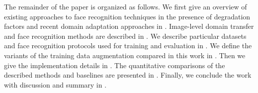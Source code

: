 The remainder of the paper is organized as follows. We first give an overview of existing approaches to face recognition techniques in the presence of degradation factors and recent domain adaptation approaches in . Image-level domain transfer and face recognition methods are described in . 
We describe particular datasets and face recognition protocols used for training and evaluation in . We define the variants of the training data augmentation compared in this work in . Then we give the implementation details in . The quantitative comparisons of the described methods and baselines are presented in . Finally, we conclude the work with discussion and summary in .